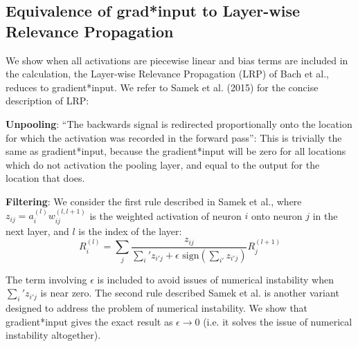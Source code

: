 \documentclass{article}
\begin{document}
\subsection{Equivalence of grad*input to Layer-wise Relevance Propagation}
We show when all activations are piecewise linear and bias terms are included in the calculation, the Layer-wise Relevance Propagation (LRP) of Bach et al., reduces to gradient*input. We refer to Samek et al. (2015) for the concise description of LRP:

{\bf Unpooling}: ``The backwards signal is redirected proportionally onto the location for which the activation was recorded in the forward pass'': This is trivially the same as gradient*input, because the gradient*input will be zero for all locations which do not activation the pooling layer, and equal to the output for the location that does.

{\bf Filtering}: We consider the first rule described in Samek et al., where $z_{ij} = a_i^{(l)} w_{ij}^{(l,l+1)}$ is the weighted activation of neuron $i$ onto neuron $j$ in the next layer, and $l$ is the index of the layer:
\begin{equation}
R_i^{(l)} = \sum_j \frac{z_{ij}}{\sum_i' z_{i'j} + \epsilon \text{ sign}(\sum_{i'} z_{i'j})}R_j^{(l+1)}
\end{equation}

The term involving $\epsilon$ is included to avoid issues of numerical instability when $\sum_i' z_{i'j}$ is near zero. The second rule described Samek et al. is another variant designed to address the problem of numerical instability. We show that gradient*input gives the exact result as $\epsilon \rightarrow 0$ (i.e. it solves the issue of numerical instability altogether).
\end{document}
